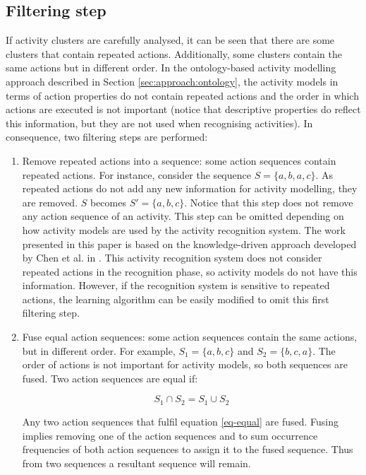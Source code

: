 \subsection{Filtering step}
\label{subsec:learner:filtering}

If activity clusters are carefully analysed, it can be seen that there are some clusters that contain repeated actions. Additionally, some clusters contain the same actions but in different order. In the ontology-based activity modelling approach described in Section \ref{sec:approach:ontology}, the activity models in terms of action properties do not contain repeated actions and the order in which actions are executed is not important (notice that descriptive properties do reflect this information, but they are not used when recognising activities). In consequence, two filtering steps are performed:

\begin{enumerate}
 \item Remove repeated actions into a sequence: some action sequences contain repeated actions. For instance, consider the sequence $S=\{a, b, a, c\}$. As repeated actions do not add any new information for activity modelling, they are removed. $S$ becomes $S' = \{a, b, c\}$. Notice that this step does not remove any action sequence of an activity. This step can be omitted depending on how activity models are used by the activity recognition system. The work presented in this paper is based on the knowledge-driven approach developed by Chen et al. in \cite{Chen2012a}. This activity recognition system does not consider repeated actions in the recognition phase, so activity models do not have this information. However, if the recognition system is sensitive to repeated actions, the learning algorithm can be easily modified to omit this first filtering step.
 
 \item Fuse equal action sequences: some action sequences contain the same actions, but in different order. For example, $S_1 = \{a, b, c \}$ and $S_2 = \{b, c, a\}$. The order of actions is not important for activity models, so both sequences are fused. Two action sequences are equal if:
 
 \begin{equation}
 \label{eq-equal}
  S_1 \cap S_2 = S_1 \cup S_2
 \end{equation}

 Any two action sequences that fulfil equation \ref{eq-equal} are fused. Fusing implies removing one of the action sequences and to sum occurrence frequencies of both action sequences to assign it to the fused sequence. Thus from two sequences a resultant sequence will remain.

\end{enumerate}


